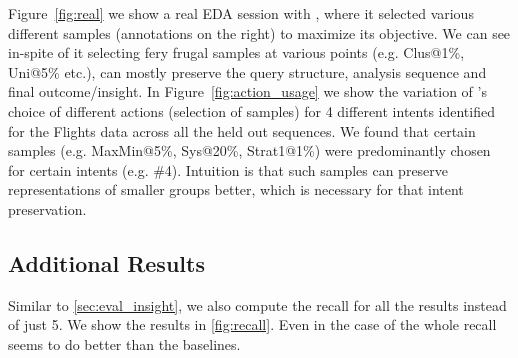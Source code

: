 Figure~\ref{fig:real} we show a real EDA session with \name{}, where it 
selected various different samples (annotations on the right) to maximize its objective. We can see in-spite of it selecting fery frugal samples at various points (e.g. Clus@1\%, Uni@5\% etc.), \name{} can mostly preserve the query structure, analysis sequence and final outcome/insight. 
In Figure~\ref{fig:action_usage} we show the variation of \name{}'s choice of different actions (selection of samples) for 4 different intents identified for the Flights data across all the held out sequences.
We found that certain samples (e.g. MaxMin@5\%, Sys@20\%, Strat1@1\%) were predominantly chosen for certain intents (e.g. \#4). Intuition is that such samples can preserve representations of smaller groups better, which is necessary for that intent preservation.




\subsection{Additional Results}
\label{app:add_res}
Similar to \ref{sec:eval_insight}, we also compute the recall for all the results instead of just 5. We show the results in \ref{fig:recall}. Even in the case of the whole recall \name{} seems to do better than the baselines.

